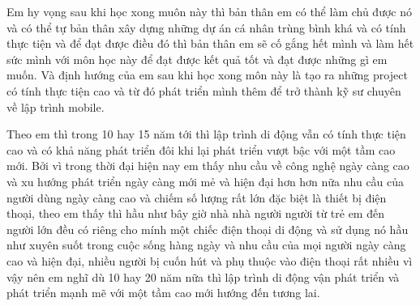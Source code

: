 \documentclass[a4paper,12pt]{article} %
\begin{document}

Em hy vọng sau khi học xong muôn này thì bản thân em có thể làm chủ được nó và có thể tự bản thân xây dựng những dự án cá nhân trùng bình khá và có tính thực tiện và để đạt được điều đó thì bản thân em sẽ cố gắng hết mình và làm hết sức mình với môn học này để đạt được kết quả tốt và đạt được những gì em muốn. Và định hướng của em sau khi học xong môn này là tạo ra những project có tính thực tiện cao và từ đó phát triển mình thêm để trở thành kỹ sư chuyên về lập trình mobile.

Theo em thì trong 10 hay 15 năm tới thì lập trình di động vẫn có tính thực tiện cao và có khả năng phát triển đôi khi lại phát triển vượt bậc với một tầm cao mới. Bởi vì trong thời đại hiện nay em thấy nhu cầu về công nghệ ngày càng cao và xu hướng phát triển ngày càng mới mẻ và hiện đại hơn hơn nữa nhu cầu của người dùng ngày càng cao và chiếm số lượng rất lớn đặc biệt là thiết bị điện thoại, theo em thấy thì hầu như bây giờ nhà nhà người người từ trẻ em đến người lớn đều có riêng cho mính một chiếc điện thoại di động và sử dụng nó hầu như xuyên suốt trong cuộc sống hàng ngày và nhu cầu của mọi người ngày càng cao và hiện đại, nhiều người bị cuốn hút và phụ thuộc vào điện thoại rất nhiều vì vậy nên em nghĩ dù 10 hay 20 năm nữa thì lập trình di động vận phát triển và phát triển mạnh mẽ với một tầm cao mới hướng đến tương lai.
\end{document}
